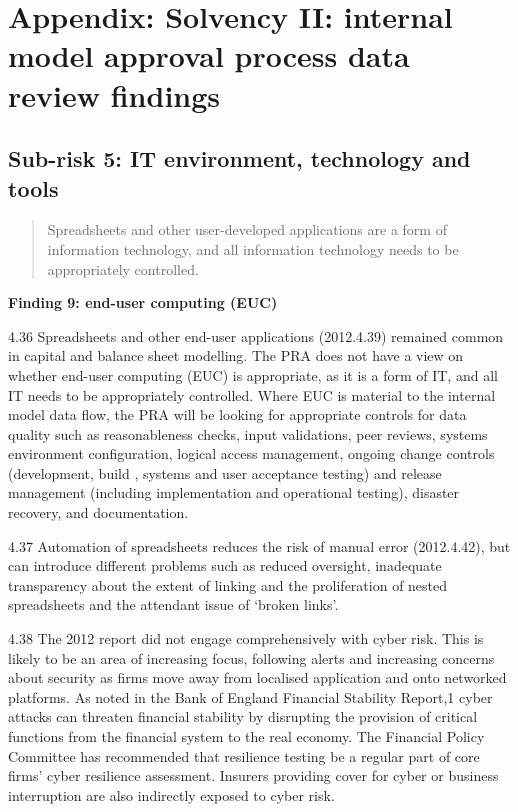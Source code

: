 \documentclass[]{book}
\begin{document}
\hypertarget{appendix-solvency-ii-internal-model-approval-process-data-review-findings}{%
\section{Appendix: Solvency II: internal model approval process data review findings}\label{appendix-solvency-ii-internal-model-approval-process-data-review-findings}}

\hypertarget{sub-risk-5-it-environment-technology-and-tools}{%
\subsection{Sub-risk 5: IT environment, technology and tools}\label{sub-risk-5-it-environment-technology-and-tools}}

\begin{quote}
Spreadsheets and other user-developed applications are a form of information technology,
and all information technology needs to be appropriately controlled.
\end{quote}

\textbf{Finding 9: end-user computing (EUC)}

4.36 Spreadsheets and other end-user applications (2012.4.39) remained common in capital
and balance sheet modelling. The PRA does not have a view on whether end-user computing
(EUC) is appropriate, as it is a form of IT, and all IT needs to be appropriately
controlled. Where EUC is material to the internal model data flow, the PRA will be looking
for appropriate controls for data quality such as reasonableness checks, input validations,
peer reviews, systems environment configuration, logical access management, ongoing change
controls (development, build , systems and user acceptance testing) and release management
(including implementation and operational testing), disaster recovery, and documentation.

4.37 Automation of spreadsheets reduces the risk of manual error (2012.4.42), but can
introduce different problems such as reduced oversight, inadequate transparency about the
extent of linking and the proliferation of nested spreadsheets and the attendant issue of
`broken links'.

4.38 The 2012 report did not engage comprehensively with cyber risk. This is likely to be
an area of increasing focus, following alerts and increasing concerns about security as
firms move away from localised application and onto networked platforms. As noted in the
Bank of England Financial Stability Report,1 cyber attacks can threaten financial stability
by disrupting the provision of critical functions from the financial system to the real
economy. The Financial Policy Committee has recommended that resilience testing be a
regular part of core firms' cyber resilience assessment. Insurers providing cover for cyber
or business interruption are also indirectly exposed to cyber risk.
\end{document}
